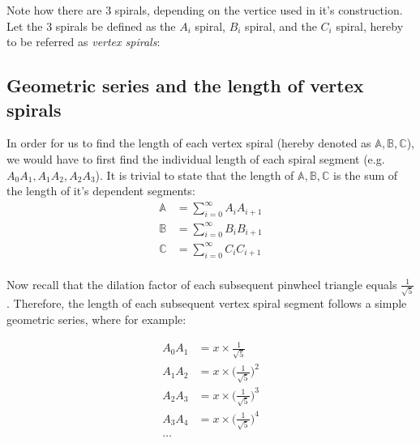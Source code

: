 

\noindent
Note how there are 3 spirals, depending on the vertice used in it's construction. Let the 3 spirals be defined as the $A_{i}$ spiral, $B_{i}$ spiral, and the $C_{i}$ spiral, hereby to be referred as \emph{vertex spirals}:







\newpage
\subsection{Geometric series and the length of vertex spirals}
In order for us to find the length of each vertex spiral (hereby denoted as $\mathbb{A}, \mathbb{B}, \mathbb{C}$), we would have to first find the individual length of each spiral segment (e.g. $A_{0}A_{1}, A_{1}A_{2}, A_{2}A_{3}$). It is trivial to state that the length of $\mathbb{A}, \mathbb{B}, \mathbb{C}$ is the sum of the length of it's dependent segments:
\begin{equation}
    \begin{aligned}
        \mathbb{A} &= \sum_{i = 0}^{\infty} A_{i}A_{i+1} \\
        \mathbb{B} &= \sum_{i = 0}^{\infty} B_{i}B_{i+1} \\
        \mathbb{C} &= \sum_{i = 0}^{\infty} C_{i}C_{i+1} \\
    \end{aligned}
\end{equation}

\noindent
Now recall that the dilation factor of each subsequent pinwheel triangle equals $\frac{1}{\sqrt{5}}$. Therefore, the length of each subsequent vertex spiral segment follows a simple geometric series, where for example:

\begin{equation}
    \begin{aligned}
        A_{0}A_{1} &= x \times \frac{1}{\sqrt{5}} \\
        A_{1}A_{2} &= x \times \big(\frac{1}{\sqrt{5}}\big)^2 \\
        A_{2}A_{3} &= x \times \big(\frac{1}{\sqrt{5}}\big)^3 \\
        A_{3}A_{4} &= x \times \big(\frac{1}{\sqrt{5}}\big)^4 \\
        \ldots
    \end{aligned}
\end{equation}

